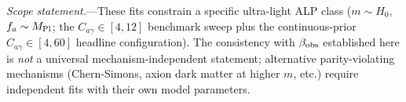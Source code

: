 \documentclass[aps,prd,twocolumn,superscriptaddress,showpacs,preprintnumbers,nofootinbib,longbibliography,floatfix]{revtex4-2}
\newcommand{\MPl}{M_{\rm Pl}}
\begin{document}
\textit{Scope statement.}---These fits constrain a specific ultra-light
ALP class ($m\sim H_0$, $f_a\sim\MPl$; the $C_{a\gamma}\in[4,12]$ benchmark
sweep plus the continuous-prior $C_{a\gamma}\in[4,60]$ headline
configuration). The consistency with $\beta_{\rm obs}$ established here is
\emph{not} a universal mechanism-independent statement; alternative
parity-violating mechanisms (Chern-Simons, axion dark matter at higher
$m$, etc.) require independent fits with their own model parameters.







\end{document}
